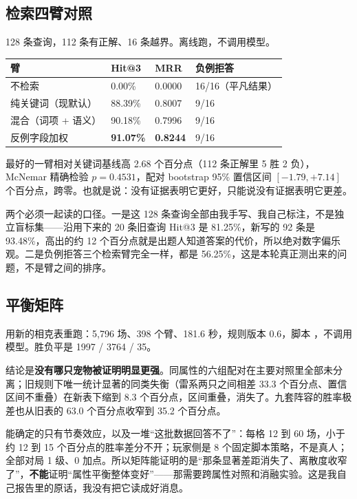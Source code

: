 \subsection{检索四臂对照}

128 条查询，112 条有正解、16 条越界。离线跑，不调用模型。

\begin{table}[h]
\centering
\small
\begin{tabular}{L{4.4cm}L{2.4cm}L{2.4cm}L{4.1cm}}
\toprule
臂 & Hit@3 & MRR & 负例拒答 \\
\midrule
不检索 & 0.00\% & 0.0000 & 16/16（平凡结果） \\
纯关键词（现默认） & 88.39\% & 0.8007 & 9/16 \\
混合（词项 + 语义） & 90.18\% & 0.7996 & 9/16 \\
反例字段加权 & \textbf{91.07\%} & \textbf{0.8244} & 9/16 \\
\bottomrule
\end{tabular}
\end{table}

最好的一臂相对关键词基线高 2.68 个百分点（112 条正解里 5 胜 2 负），McNemar 精确检验 $p = 0.4531$，配对 bootstrap 95\% 置信区间 $[-1.79, +7.14]$ 个百分点，跨零。也就是说：没有证据表明它更好，只能说没有证据表明它更差。

两个必须一起读的口径。一是这 128 条查询全部由我手写、我自己标注，不是独立盲标集——沿用下来的 20 条旧查询 Hit@3 是 81.25\%，新写的 92 条是 93.48\%，高出的约 12 个百分点就是出题人知道答案的代价，所以绝对数字偏乐观。二是负例拒答三个检索臂完全一样，都是 56.25\%，这是本轮真正测出来的问题，不是臂之间的排序。

\subsection{平衡矩阵}

用新的相克表重跑：5{,}796 场、398 个臂、181.6 秒，规则版本 0.6，脚本 ，不调用模型。胜负平是 1997 / 3764 / 35。

结论是\textbf{没有哪只宠物被证明明显更强}。同属性的六组配对在主要对照里全部未分离；旧规则下唯一统计显著的同类失衡（雷系两只之间相差 33.3 个百分点、置信区间不重叠）在新表下缩到 8.3 个百分点，区间重叠，消失了。九套阵容的胜率极差也从旧表的 63.0 个百分点收窄到 35.2 个百分点。

能确定的只有节奏效应，以及一堆“这批数据回答不了”：每格 12 到 60 场，小于约 12 到 15 个百分点的胜率差分不开；玩家侧是 8 个固定脚本策略，不是真人；全部对局 1 级、0 加点。所以矩阵能证明的是“那条显著差距消失了、离散度收窄了”，\textbf{不能}证明“属性平衡整体变好”——那需要跨属性对照和消融实验。这是我自己报告里的原话，我没有把它读成好消息。

